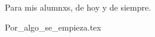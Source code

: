 \documentclass[12pt]{book}
\begin{document}
  
  \begin{center}
      \thispagestyle{empty}
      \vspace*{\fill}
      Para mis alumnxs, de hoy y de siempre.
      \vspace*{\fill}
  \end{center}
  \clearpage
  
  \tableofcontents

  \mainmatter
  {Por_algo_se_empieza.tex}
  \printindex
\end{document}
